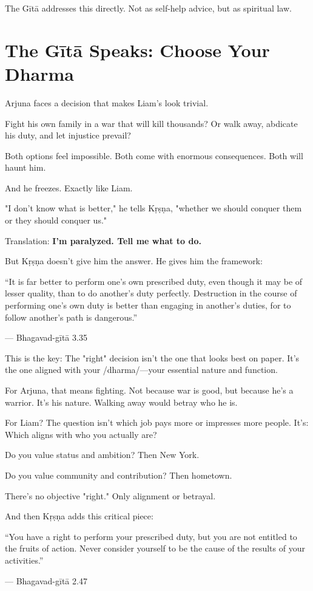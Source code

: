 \documentclass[11pt,twoside]{book}
\begin{document}
The Gītā addresses this directly. Not as self-help advice, but as spiritual law.

\section*{The Gītā Speaks: Choose Your Dharma}

Arjuna faces a decision that makes Liam's look trivial.

Fight his own family in a war that will kill thousands? Or walk away, abdicate his duty, and let injustice prevail?

Both options feel impossible. Both come with enormous consequences. Both will haunt him.

And he freezes. Exactly like Liam.

"I don't know what is better," he tells Kṛṣṇa, "whether we should conquer them or they should conquer us."

Translation: \textbf{I'm paralyzed. Tell me what to do.}

But Kṛṣṇa doesn't give him the answer. He gives him the framework:

\begin{pullquote}
``It is far better to perform one's own prescribed duty, even though it may be of lesser quality, than to do another's duty perfectly. Destruction in the course of performing one's own duty is better than engaging in another's duties, for to follow another's path is dangerous.''

--- Bhagavad-gītā 3.35
\end{pullquote}

This is the key: The "right" decision isn't the one that looks best on paper. It's the one aligned with your /dharma/—your essential nature and function.

For Arjuna, that means fighting. Not because war is good, but because he's a warrior. It's his nature. Walking away would betray who he is.

For Liam? The question isn't which job pays more or impresses more people. It's: Which aligns with who you actually are?

Do you value status and ambition? Then New York.

Do you value community and contribution? Then hometown.

There's no objective "right." Only alignment or betrayal.

And then Kṛṣṇa adds this critical piece:

\begin{pullquote}
``You have a right to perform your prescribed duty, but you are not entitled to the fruits of action. Never consider yourself to be the cause of the results of your activities.''

--- Bhagavad-gītā 2.47
\end{pullquote}
\end{document}
